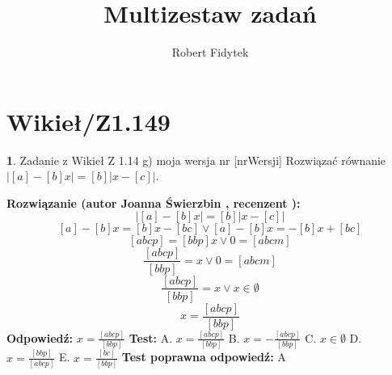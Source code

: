 \documentclass[12pt, a4paper]{article}
\title{Multizestaw zadań}
\author{Robert Fidytek}
\date{}
\theoremstyle{definition} %
\newtheorem{zad}{}
\newcommand{\kategoria}[1]{\section{#1}} %
\newcommand{\zadStart}[1]{\begin{zad}#1\newline} %
\newcommand{\zadStop}{\end{zad}}   %
\newcommand{\rozwStart}[2]{\noindent \textbf{Rozwiązanie (autor #1 , recenzent #2): }\newline} %
\newcommand{\rozwStop}{\newline}                                            %
\newcommand{\odpStart}{\noindent \textbf{Odpowiedź:}\newline}    %
\newcommand{\odpStop}{\newline}                                             %
\newcommand{\testStart}{\noindent \textbf{Test:}\newline} %
\newcommand{\testStop}{\newline} %
\newcommand{\kluczStart}{\noindent \textbf{Test poprawna odpowiedź:}\newline} %
\newcommand{\kluczStop}{\newline} %
\begin{document}
\maketitle


\kategoria{Wikieł/Z1.149}
\zadStart{Zadanie z Wikieł Z 1.14 g) moja wersja nr [nrWersji]}
Rozwiązać równanie  $|[a]-[b]x| = [b]|x-[c]|$.
\zadStop
\rozwStart{Joanna Świerzbin}{}
$$|[a]-[b]x| = [b]|x-[c]|$$
$$[a]-[b]x = [b]x-[bc] \vee [a]-[b]x = -[b]x+[bc] $$
$$[abcp]= [bbp]x \vee 0 = [abcm] $$
$$\frac{[abcp]}{[bbp]}=x \vee 0 = [abcm] $$
$$\frac{[abcp]}{[bbp]}=x \vee x \in \emptyset $$
$$x=\frac{[abcp]}{[bbp]}$$
\rozwStop
\odpStart
$x=\frac{[abcp]}{[bbp]}$
\odpStop
\testStart
A. $x=\frac{[abcp]}{[bbp]}$
B. $x=-\frac{[abcp]}{[bbp]}$
C. $x \in \emptyset $
D. $x=\frac{[bbp]}{[abcp]}$
E. $x=\frac{[bc]}{[bbp]}$
\testStop
\kluczStart
A
\kluczStop
\end{document}
